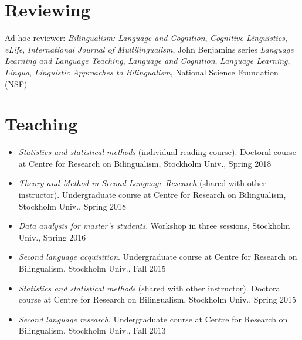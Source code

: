 \documentclass[margin, 11pt]{res} %
\begin{document}
\begin{resume}
\section{\sc Reviewing}

Ad hoc reviewer: 
\textit{Bilingualism: Language and Cognition},
\textit{Cognitive Linguistics},
\textit{eLife},
\textit{International Journal of Multilingualism},
John Benjamins series \textit{Language Learning and Language Teaching},
\textit{Language and Cognition},
\textit{Language Learning},
\textit{Lingua},
\textit{Linguistic Approaches to Bilingualism},
National Science Foundation (NSF)





\section{\sc Teaching}

\begin{itemize}

\item \textit{Statistics and statistical methods} (individual reading course). Doctoral course at Centre for Research on Bilingualism, Stockholm Univ., Spring 2018

\item \textit{Theory and Method in Second Language Research} (shared with other instructor). Undergraduate course at Centre for Research on Bilingualism, Stockholm Univ., Spring 2018

\item \textit{Data analysis for master's students}. Workshop in three sessions, Stockholm Univ., Spring 2016

\item \textit{Second language acquisition}. Undergraduate course at Centre for Research on Bilingualism, Stockholm Univ., Fall 2015

\item \textit{Statistics and statistical methods} (shared with other instructor). Doctoral course at Centre for Research on Bilingualism, Stockholm Univ., Spring 2015

\item \textit{Second language research}. Undergraduate course at Centre for Research on Bilingualism, Stockholm Univ., Fall 2013 


\end{itemize}
\end{resume}
\end{document}
